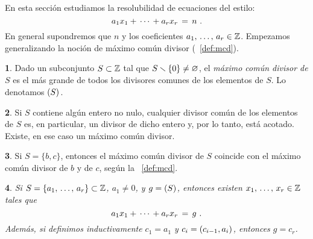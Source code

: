 \theoremstyle{plain}
\newtheorem{teoLineales}{\teoname}[section]
\newtheorem{coroLineales}[teoLineales]{\coroname}

\theoremstyle{definition}
\newtheorem{defLineales}[teoLineales]{}
\newtheorem{ejemLineales}[teoLineales]{\ejemname}
\newtheorem{obsLineales}[teoLineales]{\obsname}


En esta secci\'on estudiamos la resolubilidad de ecuaciones del estilo:
\begin{equation}
	\label{eq:lineales}
	a_1x_1+\,\cdots\,+a_rx_r\,=\,n
	\text{ .}
\end{equation}
%
En general supondremos que $n$ y los coeficientes $\lista a r\in\Enteros$.
Empezamos generalizando la noci\'on de m\'aximo com\'un divisor
(~\ref{def:mcd}).

\begin{defLineales}\label{def:lineales:mcd}
	Dado un subconjunto $S\subset\mathbb{Z}$ tal que
	$S\smallsetminus\{0\}\neq\varnothing$, el \emph{m\'aximo com\'un %
	divisor de $S$} es el m\'as grande de todos los divisores
	comunes de los elementos de $S$.
	Lo denotamos $\left({S}\right)_{}$.
\end{defLineales}

\begin{obsLineales}\label{obs:lineales:mcd:existe}
	Si $S$ contiene alg\'un entero no nulo, cualquier divisor
	com\'un de los elementos de $S$ es, en particular, un divisor
	de dicho entero y, por lo tanto, est\'a acotado. Existe,
	en ese caso un m\'aximo com\'un divisor.
\end{obsLineales}

\begin{obsLineales}\label{obs:lineales:mcd}
	Si $S=\{b,c\}$, entonces el m\'aximo com\'un divisor de $S$
	coincide con el m\'aximo com\'un divisor de $b$ y de $c$,
	seg\'un la ~\ref{def:mcd}.
\end{obsLineales}

\begin{teoLineales}\label{teo:lineales:bezout}
	Si $S=\{\lista a r\}\subset\Enteros$, $a_1\neq 0$, y $g=\left({S}\right)_{}$,
	entonces existen $\lista x r\in\Enteros$ tales que
	\begin{displaymath}
		a_1x_1+\,\cdots\,+a_rx_r\,=\,g
		\text{ .}
	\end{displaymath}
	Adem\'as, si definimos inductivamente
	$c_1=a_1$ y $c_i=\left({c_{i-1},a_i}\right)_{}$, entonces $g=c_r$.
\end{teoLineales}


